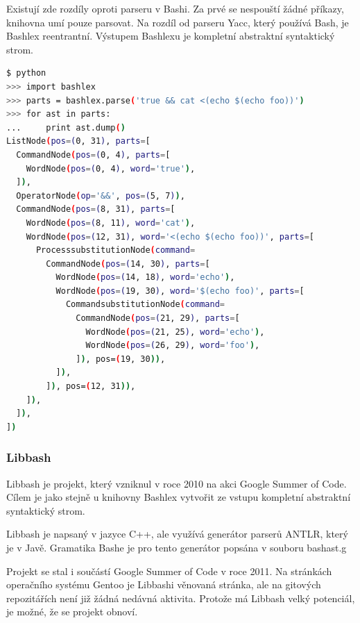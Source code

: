 \documentclass[thesis=M,czech]{FITthesis}[2012/06/26]
\begin{document}
Existují zde rozdíly oproti parseru v Bashi. Za prvé se nespouští žádné příkazy, knihovna umí pouze parsovat. Na rozdíl od parseru Yacc, který používá Bash, je Bashlex reentrantní. Výstupem Bashlexu je kompletní abstraktní syntaktický strom.

\begin{minipage}{\linewidth}
\begin{lstlisting}[language=bash, caption={Výstup z knihovny Bashlex}, label={lst:bashlex}]
$ python
>>> import bashlex
>>> parts = bashlex.parse('true && cat <(echo $(echo foo))')
>>> for ast in parts:
...     print ast.dump()
ListNode(pos=(0, 31), parts=[
  CommandNode(pos=(0, 4), parts=[
    WordNode(pos=(0, 4), word='true'),
  ]),
  OperatorNode(op='&&', pos=(5, 7)),
  CommandNode(pos=(8, 31), parts=[
    WordNode(pos=(8, 11), word='cat'),
    WordNode(pos=(12, 31), word='<(echo $(echo foo))', parts=[
      ProcesssubstitutionNode(command=
        CommandNode(pos=(14, 30), parts=[
          WordNode(pos=(14, 18), word='echo'),
          WordNode(pos=(19, 30), word='$(echo foo)', parts=[
            CommandsubstitutionNode(command=
              CommandNode(pos=(21, 29), parts=[
                WordNode(pos=(21, 25), word='echo'),
                WordNode(pos=(26, 29), word='foo'),
              ]), pos=(19, 30)),
          ]),
        ]), pos=(12, 31)),
    ]),
  ]),
])
\end{lstlisting}
\end{minipage}


%
%
%
\subsubsection{Libbash}

Libbash je projekt, který vzniknul v roce 2010 na akci Google Summer of Code. Cílem je jako stejně u knihovny Bashlex vytvořit ze vstupu kompletní abstraktní syntaktický strom.

Libbash je napsaný v jazyce C++, ale využívá generátor parserů ANTLR, který je v Javě. Gramatika Bashe je pro tento generátor popsána v souboru bashast.g

Projekt se stal i součástí Google Summer of Code v roce 2011. Na stránkách operačního systému Gentoo je Libbashi věnovaná stránka, ale na gitových repozitářích není již žádná nedávná aktivita. Protože má Libbash velký potenciál, je možné, že se projekt obnoví.


\end{document}
